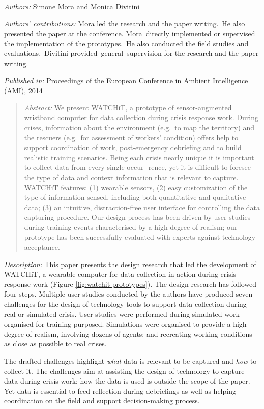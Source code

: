 \emph{Authors:} Simone Mora and Monica Divitini

\emph{Authors' contributions:} Mora led the research and the paper writing.~He also presented the paper at the conference. Mora~directly implemented or supervised the implementation of the prototypes.~He also conducted the field studies and evaluations.~Divitini provided~general~supervision for the research and the paper writing.

\emph{Published in:} Proceedings of the European Conference in Ambient Intelligence (AMI), 2014
\begin{quote}
	\emph{Abstract:} We present WATCHiT, a prototype of sensor-augmented wristband computer for data collection during crisis response work. During crises, information about the environment (e.g.~to map the territory) and the rescuers (e.g.~for assessment of workers' condition) offers help to support coordination of work, post-emergency debriefing and to build realistic training scenarios. Being each crisis nearly unique it is important to collect data from every single occur- rence, yet it is difficult to foresee the type of data and context information that is relevant to capture. WATCHiT features: (1) wearable sensors, (2) easy customization of the type of information sensed, including both quantitative and qualitative data; (3) an intuitive, distraction-free user interface for controlling the data capturing procedure. Our design process has been driven by user studies during training events characterised by a high degree of realism; our prototype has been successfully evaluated with experts against technology acceptance. 
\end{quote}

\emph{Description:} This paper presents the design research that led the development of WATCHiT, a wearable computer for data collection in-action during crisis response work (Figure \ref{fig:watchit-prototypes}). The design research has followed four steps. Multiple user studies conducted by the authors have produced seven challenges for the design of technology tools to support data collection during real or simulated crisis. User studies were performed during simulated work organised for training purposed. Simulations were organised to provide a high degree of realism, involving dozens of agents; and recreating working conditions as close as possible to real crises.

The drafted challenges highlight \emph{what} data is relevant to be captured and \emph{how} to collect it. The challenges aim at assisting the design of technology to capture data during crisis work; how the data is used is outside the scope of the paper. Yet data is essential to feed reflection during debriefings as well as helping coordination on the field and support decision-making process.

